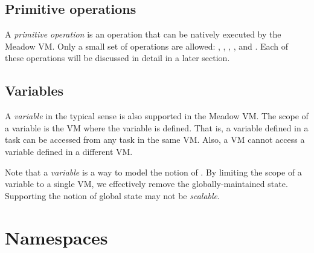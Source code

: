 \documentclass{pamsbook}
\begin{document}
\subsection{Primitive operations}
A {\em primitive operation\/} is an operation  that can be natively executed
by the Meadow VM. Only a small set of operations are allowed:
, , , , and .  Each of these operations will
be discussed in detail in a later section. 



\subsection{Variables}
A {\em variable\/} in the typical sense is also supported in the Meadow VM.
The scope of a variable is the VM where the variable is defined. 
That is, a variable defined in a task can be accessed from any task in the
same VM. Also, a VM cannot access a variable defined in a different
VM.

Note that a {\em variable\/} is a way to model the notion of . 
By limiting the scope of a variable to a single VM, we
effectively remove the globally-maintained state. Supporting the notion of
global state may not be {\em scalable\/}.





\section{Namespaces}
\end{document}
